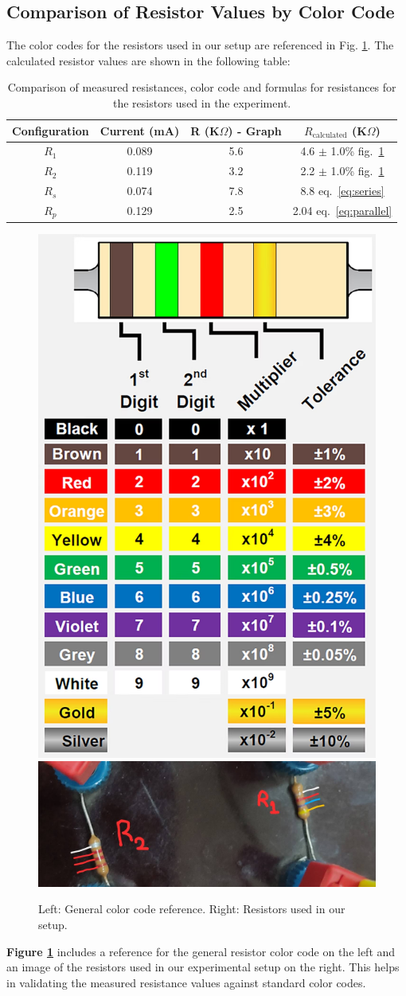 \documentclass[journal]{IEEEtran}
\begin{document}
\subsection{Comparison of Resistor Values by Color Code}
The color codes for the resistors used in our setup are referenced in Fig. \ref{fig:color_code}. The calculated resistor values are shown in the following table:

\begin{table}[H]
\centering
\begin{tabular}{cccc}
\hline
Configuration & Current (mA) & R (K$\Omega$) - Graph & $R_{\text{calculated}}$ (K$\Omega$) \\
\hline
$R_1$ & 0.089 & 5.6 & 4.6 $\pm$ 1.0\% fig.~\ref{fig:color_code}\\
$R_2$ & 0.119 & 3.2 & 2.2 $\pm$ 1.0\% fig.~\ref{fig:color_code}\\
$R_s$ & 0.074 & 7.8 & 8.8 eq.~\ref{eq:series}\\
$R_p$ & 0.129 & 2.5 & 2.04 eq.~\ref{eq:parallel}\\
\hline
\end{tabular}
\caption{Comparison of measured resistances, color code and formulas for resistances for the resistors used in the experiment.}
\end{table}

\begin{figure}[H]
    \centering
    \includegraphics[width=0.45\linewidth]{IMAGES/ColorCode.png}
    \includegraphics[width=0.45\linewidth]{IMAGES/Used_Resistors.jpg}
    \caption{Left: General color code reference. Right: Resistors used in our setup.}
    \label{fig:color_code}
\end{figure}
\textbf{Figure \ref{fig:color_code}} includes a reference for the general resistor color code on the left and an image of the resistors used in our experimental setup on the right. This helps in validating the measured resistance values against standard color codes.
\end{document}
